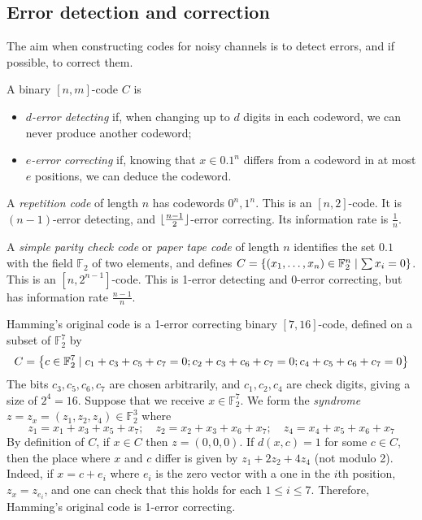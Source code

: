 \subsection{Error detection and correction}
The aim when constructing codes for noisy channels is to detect errors, and if possible, to correct them.
\begin{definition}
    A binary \( [n,m] \)-code \( C \) is
    \begin{itemize}
        \item \emph{\( d \)-error detecting} if, when changing up to \( d \) digits in each codeword, we can never produce another codeword;
        \item \emph{\( e \)-error correcting} if, knowing that \( x \in \qty{0,1}^n \) differs from a codeword in at most \( e \) positions, we can deduce the codeword.
    \end{itemize}
\end{definition}
\begin{example}
    A \emph{repetition code} of length \( n \) has codewords \( 0^n, 1^n \).
    This is an \( [n,2] \)-code.
    It is \( (n-1) \)-error detecting, and \( \lfloor\frac{n-1}{2}\rfloor \)-error correcting.
    Its information rate is \( \frac{1}{n} \).
\end{example}
\begin{example}
    A \emph{simple parity check code} or \emph{paper tape code} of length \( n \) identifies the set \( \qty{0,1} \) with the field \( \mathbb F_2 \) of two elements, and defines \( C = \qty{(x_1, \dots, x_n) \in \mathbb F_2^n \mid \sum x_i = 0} \).
    This is an \( [n,2^{n-1}] \)-code.
    This is 1-error detecting and 0-error correcting, but has information rate \( \frac{n-1}{n} \).
\end{example}
\begin{example}
    Hamming's original code is a 1-error correcting binary \( [7,16] \)-code, defined on a subset of \( \mathbb F_2^7 \) by
    \[ C = \qty{c \in \mathbb F_2^7 \mid c_1 + c_3 + c_5 + c_7 = 0; c_2 + c_3 + c_6 + c_7 = 0; c_4 + c_5 + c_6 + c_7 = 0} \]
    The bits \( c_3, c_5, c_6, c_7 \) are chosen arbitrarily, and \( c_1, c_2, c_4 \) are check digits, giving a size of \( 2^4 = 16 \).
    Suppose that we receive \( x \in \mathbb F_2^7 \).
    We form the \emph{syndrome} \( z = z_x = (z_1, z_2, z_4) \in \mathbb F_2^3 \) where
    \[ z_1 = x_1 + x_3 + x_5 + x_7;\quad z_2 = x_2 + x_3 + x_6 + x_7;\quad z_4 = x_4 + x_5 + x_6 + x_7 \]
    By definition of \( C \), if \( x \in C \) then \( z = (0, 0, 0) \).
    If \( d(x,c) = 1 \) for some \( c \in C \), then the place where \( x \) and \( c \) differ is given by \( z_1 + 2z_2 + 4z_4 \) (not modulo 2).
    Indeed, if \( x = c + e_i \) where \( e_i \) is the zero vector with a one in the \( i \)th position, \( z_x = z_{e_i} \), and one can check that this holds for each \( 1 \leq i \leq 7 \).
    Therefore, Hamming's original code is 1-error correcting.
\end{example}
